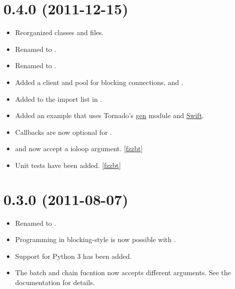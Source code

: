 \documentclass[letterpaper,10pt,english]{sphinxmanual}
\begin{document}
\section{0.4.0 (2011-12-15)}
\label{changelog:id3}\begin{itemize}
\item {} 
Reorganized classes and files.

\item {} 
Renamed  to .

\item {} 
Renamed  to .

\item {} 
Added a client and pool for blocking connections, 
and .

\item {} 
Added  to the import list in .

\item {} 
Added an example that uses Tornado's \href{http://www.tornadoweb.org/documentation/gen.html}{gen} module and \href{http://code.naeseth.com/swirl/}{Swift}.

\item {} 
Callbacks are now optional for .

\item {} 
 and  now accept a ioloop argument. {[}\href{https://github.com/fzzbt}{fzzbt}{]}

\item {} 
Unit tests have been added. {[}\href{https://github.com/fzzbt}{fzzbt}{]}

\end{itemize}


\section{0.3.0 (2011-08-07)}
\label{changelog:id4}\label{changelog:fzzbt}\begin{itemize}
\item {} 
Renamed  to .

\item {} 
Programming in blocking-style is now possible with .

\item {} 
Support for Python 3 has been added.

\item {} 
The batch and chain fucntion now accepts different arguments. See the
documentation for details.

\end{itemize}
\end{document}
